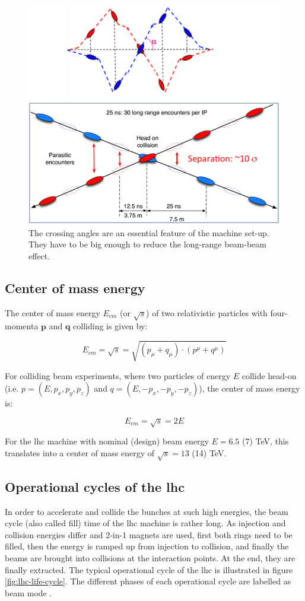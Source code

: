 \documentclass[encoding=utf8,british]{tumphthesis}
\begin{document}
\begin{figure}[H]
    \centering
    \includegraphics[width=0.6\linewidth]{figures/LHCReport_1_image.png}
    \caption{The crossing angles are an essential feature of the machine set-up. They have to be big enough to reduce the long-range beam-beam effect. \cite{CERN-report-crossing-angle}}
    \label{fig:lhc-report-crossing-angle}
\end{figure}

\subsection{Center of mass energy}

The center of mass energy $E_{cm}$ (or $\sqrt{s}$) of two relativistic particles with four-momenta $\textbf{p}$ and $\textbf{q}$ colliding is given by:

\begin{equation}
    E_{cm} = \sqrt{s} = \sqrt{(p_{\mu} + q_{\mu}) \cdot (p^{\mu} + q^{\mu})}
\end{equation}

For colliding beam experiments, where two particles of energy $E$ collide head-on (i.e. $p=(E, p_x, p_y, p_z)$ and $q=(E, -p_x, -p_y, -p_z)$), the center of mass energy is:

\begin{equation}
    E_{cm} = \sqrt{s} = 2 E
\end{equation}

For the \acrshort{lhc} machine with nominal (design) beam energy $E=6.5$ (7) TeV, this translates into a center of mass energy of $\sqrt{s} = 13$ (14) TeV.

\subsection{Operational cycles of the \acrshort{lhc}}
\label{subsec:beam-modes}
In order to accelerate and collide the bunches at such high energies, the beam cycle (also called fill) time of the \acrshort{lhc} machine is rather long. As injection and collision energies differ and 2-in-1 magnets are used, first both rings need to be filled, then the energy is ramped up from injection to collision, and finally the beams are brought into collisions at the interaction points. At the end, they are finally extracted. The typical operational cycle of the \acrshort{lhc} is illustrated in figure \ref{fig:lhc-life-cycle}. The different phases of each operational cycle are labelled as beam mode \cite{lhc_modes}. 
\end{document}
